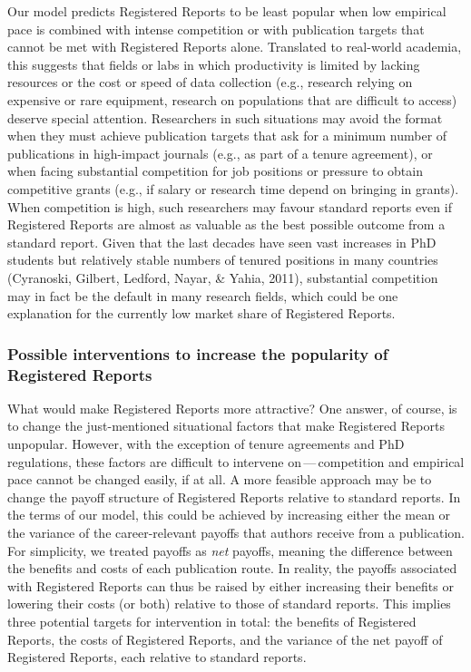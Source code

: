 \documentclass[
  ,man,mask,floatsintext]{apa6}
\begin{document}
Our model predicts Registered Reports to be least popular when low empirical pace is combined with intense competition or with publication targets that cannot be met with Registered Reports alone.
Translated to real-world academia, this suggests that fields or labs in which productivity is limited by lacking resources or the cost or speed of data collection (e.g., research relying on expensive or rare equipment, research on populations that are difficult to access) deserve special attention.
Researchers in such situations may avoid the format when they must achieve publication targets that ask for a minimum number of publications in high-impact journals (e.g., as part of a tenure agreement), or when facing substantial competition for job positions or pressure to obtain competitive grants (e.g., if salary or research time depend on bringing in grants).
When competition is high, such researchers may favour standard reports even if Registered Reports are almost as valuable as the best possible outcome from a standard report.
Given that the last decades have seen vast increases in PhD students but relatively stable numbers of tenured positions in many countries (Cyranoski, Gilbert, Ledford, Nayar, \& Yahia, 2011), substantial competition may in fact be the default in many research fields, which could be one explanation for the currently low market share of Registered Reports.

\par\vspace{.8\baselineskip}

\hypertarget{possible-interventions-to-increase-the-popularity-of-registered-reports}{%
\subsubsection{Possible interventions to increase the popularity of Registered Reports}\label{possible-interventions-to-increase-the-popularity-of-registered-reports}}

What would make Registered Reports more attractive?
One answer, of course, is to change the just-mentioned situational factors that make Registered Reports unpopular.
However,
with the exception of tenure agreements and PhD regulations, these
factors are difficult to intervene on\(\,\)---\(\,\)competition and empirical pace cannot be changed easily, if at all.
A more feasible approach may be to change the payoff structure of Registered Reports relative to standard reports.
In the terms of our model, this could be achieved by increasing either the mean or the variance of the career-relevant payoffs that authors receive from a publication.
For simplicity, we treated payoffs as \emph{net} payoffs, meaning the difference between the benefits and costs of each publication route.
In reality,
the payoffs associated with Registered Reports can thus be raised by either increasing their benefits or lowering their costs (or both) relative to those of standard reports.
This implies three potential targets for intervention in total:
the benefits of Registered Reports, the costs of Registered Reports, and the variance of the net payoff of Registered Reports, each relative to standard reports.
\end{document}
